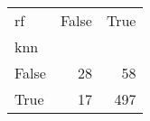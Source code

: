 \begin{tabular}{lrr}
\toprule
rf &  False &  True  \\
knn   &        &        \\
\midrule
False &     28 &     58 \\
True  &     17 &    497 \\
\bottomrule
\end{tabular}
